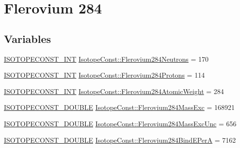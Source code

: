 \hypertarget{group___isotope_const-_flerovium-_fl284}{}\section{Flerovium 284}
\label{group___isotope_const-_flerovium-_fl284}
\subsection*{Variables}
\begin{DoxyCompactItemize}
\item 
\mbox{\hyperlink{group___isotope_const-_macros_ga5f18360b3e99483a35c32d789e62621c}{I\+S\+O\+T\+O\+P\+E\+C\+O\+N\+S\+T\+\_\+\+I\+NT}} \mbox{\hyperlink{group___isotope_const-_flerovium-_fl284_ga9b682d0f57593eb39d44d5af3ac9492d}{Isotope\+Const\+::\+Flerovium284\+Neutrons}} = 170
\item 
\mbox{\hyperlink{group___isotope_const-_macros_ga5f18360b3e99483a35c32d789e62621c}{I\+S\+O\+T\+O\+P\+E\+C\+O\+N\+S\+T\+\_\+\+I\+NT}} \mbox{\hyperlink{group___isotope_const-_flerovium-_fl284_gaf5647f44beddf51aafad69c13a3ea552}{Isotope\+Const\+::\+Flerovium284\+Protons}} = 114
\item 
\mbox{\hyperlink{group___isotope_const-_macros_ga5f18360b3e99483a35c32d789e62621c}{I\+S\+O\+T\+O\+P\+E\+C\+O\+N\+S\+T\+\_\+\+I\+NT}} \mbox{\hyperlink{group___isotope_const-_flerovium-_fl284_ga4d78c8f39ced34fb69a560b4132d83ca}{Isotope\+Const\+::\+Flerovium284\+Atomic\+Weight}} = 284
\item 
\mbox{\hyperlink{group___isotope_const-_macros_ga8f45a7272ce02c0b4c65c44636ed719a}{I\+S\+O\+T\+O\+P\+E\+C\+O\+N\+S\+T\+\_\+\+D\+O\+U\+B\+LE}} \mbox{\hyperlink{group___isotope_const-_flerovium-_fl284_ga8f055cf476ef1076832d9eaa5c89f930}{Isotope\+Const\+::\+Flerovium284\+Mass\+Exc}} = 168921
\item 
\mbox{\hyperlink{group___isotope_const-_macros_ga8f45a7272ce02c0b4c65c44636ed719a}{I\+S\+O\+T\+O\+P\+E\+C\+O\+N\+S\+T\+\_\+\+D\+O\+U\+B\+LE}} \mbox{\hyperlink{group___isotope_const-_flerovium-_fl284_ga94b4a5502e377009295505d2a5aa080a}{Isotope\+Const\+::\+Flerovium284\+Mass\+Exc\+Unc}} = 656
\item 
\mbox{\hyperlink{group___isotope_const-_macros_ga8f45a7272ce02c0b4c65c44636ed719a}{I\+S\+O\+T\+O\+P\+E\+C\+O\+N\+S\+T\+\_\+\+D\+O\+U\+B\+LE}} \mbox{\hyperlink{group___isotope_const-_flerovium-_fl284_ga9a7c40b59e37157d8cc1348af427423a}{Isotope\+Const\+::\+Flerovium284\+Bind\+E\+PerA}} = 7162
\item 

\end{DoxyCompactItemize}
